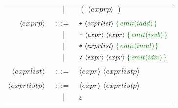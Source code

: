 \documentclass[a4paper]{article}
\newcommand{\cmd}[1]{\textcolor{MyGreen}{\{\, #1 \,\}} \;}
\newcommand{\node}[1]{\langle #1 \rangle \;}
\begin{document}
\begin{center}
\begin{tabular}{ r c l }
                      &  $|$  & $(\; \node{exprp} )$ \\\\
  $\node{exprp}$      & $::=$ & $\texttt{+}\; \node{exprlist} \cmd{emit(iadd)}$ \\
                      &  $|$  & $\texttt{-}\; \node{expr} \node{expr} \cmd{emit(isub)}$ \\
                      &  $|$  & $\texttt{*}\; \node{exprlist} \cmd{emit(imul)}$ \\
                      &  $|$  & $\texttt{/}\; \node{expr} \node{expr} \cmd{emit(idiv)}$ \\\\
  $\node{exprlist}$   & $::=$ & $\node{expr} \node{exprlistp}$ \\\\
  $\node{exprlistp}$  & $::=$ & $\node{expr} \node{exprlistp}$ \\

                      &  $|$  & $\varepsilon$
\end{tabular}
\end{center}
\end{document}
